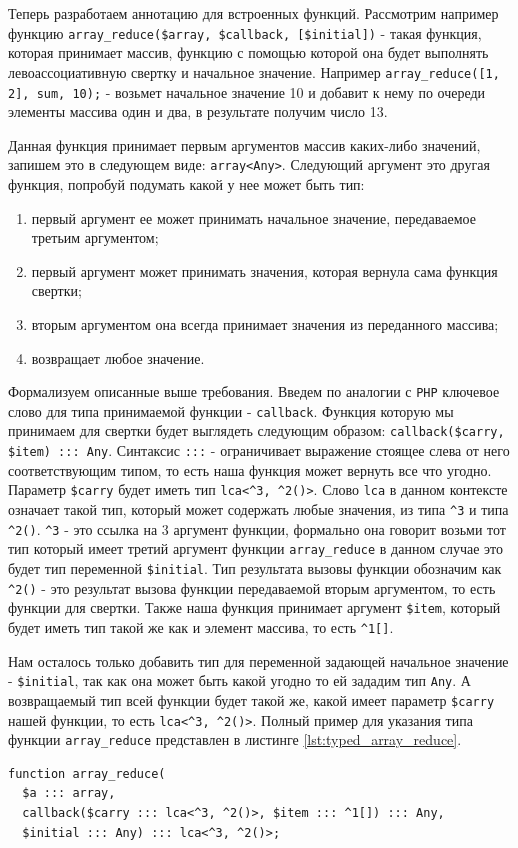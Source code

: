 Теперь разработаем аннотацию для встроенных функций.
Рассмотрим например функцию \verb|array_reduce($array, $callback, [$initial])| - такая функция, которая принимает массив, функцию с помощью которой она будет выполнять левоассоциативную свертку \cite{foldl} и начальное значение.
Например \verb|array_reduce([1, 2], sum, 10);| - возьмет начальное значение 10 и добавит к нему по очереди элементы массива один и два, в результате получим число 13.

Данная функция принимает первым аргументов массив каких-либо значений, запишем это в следующем виде: \verb|array<Any>|.
Следующий аргумент это другая функция, попробуй подумать какой у нее может быть тип:
\begin{enumerate}
  \item первый аргумент ее может принимать начальное значение, передаваемое третьим аргументом;
  \item первый аргумент может принимать значения, которая вернула сама функция свертки;
  \item вторым аргументом она всегда принимает значения из переданного массива;
  \item возвращает любое значение.
\end{enumerate}

Формализуем описанные выше требования.
Введем по аналогии с \verb|PHP| ключевое слово для типа принимаемой функции - \verb|callback|.
Функция которую мы принимаем для свертки будет выглядеть следующим образом: \verb|callback($carry, $item) ::: Any|.
Синтаксис \verb|:::| - ограничивает выражение стоящее слева от него соответствующим типом, то есть наша функция может вернуть все что угодно.
Параметр \verb|$carry| будет иметь тип \verb|lca<^3, ^2()>|.
Слово \verb|lca| в данном контексте означает такой тип, который может содержать любые значения, из типа \verb|^3| и типа \verb|^2()|.
\verb|^3| - это ссылка на 3 аргумент функции, формально она говорит возьми тот тип который имеет третий аргумент функции \verb|array_reduce| в данном случае это будет тип переменной \verb|$initial|.
Тип результата вызовы функции обозначим как \verb|^2()| - это результат вызова функции передаваемой вторым аргументом, то есть функции для свертки.
Также наша функция принимает аргумент \verb|$item|, который будет иметь тип такой же как и элемент массива, то есть \verb|^1[]|.

Нам осталось только добавить тип для переменной задающей начальное значение - \verb|$initial|, так как она может быть какой угодно то ей зададим тип \verb|Any|.
А возвращаемый тип всей функции будет такой же, какой имеет параметр \verb|$carry| нашей функции, то есть \verb|lca<^3, ^2()>|.
Полный пример для указания типа функции \verb|array_reduce| представлен в листинге \ref{lst:typed_array_reduce}.
\begin{lstlisting}[caption={Пример типизации функции array\_reduce},label={lst:typed_array_reduce}]
function array_reduce(
  $a ::: array,
  callback($carry ::: lca<^3, ^2()>, $item ::: ^1[]) ::: Any,
  $initial ::: Any) ::: lca<^3, ^2()>;
\end{lstlisting}

